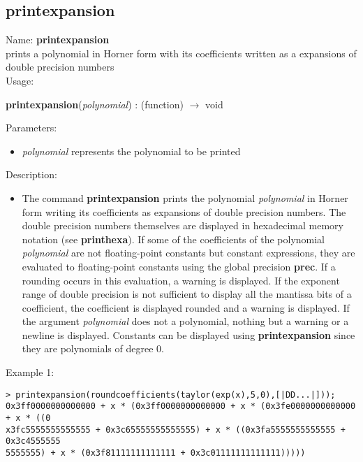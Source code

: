 \subsection{ printexpansion }
\noindent Name: \textbf{printexpansion}\\
prints a polynomial in Horner form with its coefficients written as a expansions of double precision numbers\\

\noindent Usage: 
\begin{center}
\textbf{printexpansion}(\emph{polynomial}) : (\textsf{function}) $\rightarrow$ \textsf{void}\\
\end{center}
Parameters: 
\begin{itemize}
\item \emph{polynomial} represents the polynomial to be printed
\end{itemize}
\noindent Description: \begin{itemize}

\item The command \textbf{printexpansion} prints the polynomial \emph{polynomial} in Horner form
   writing its coefficients as expansions of double precision
   numbers. The double precision numbers themselves are displayed in
   hexadecimal memory notation (see \textbf{printhexa}). 
   If some of the coefficients of the polynomial \emph{polynomial} are not
   floating-point constants but constant expressions, they are evaluated
   to floating-point constants using the global precision \textbf{prec}.  If a
   rounding occurs in this evaluation, a warning is displayed.
   If the exponent range of double precision is not sufficient to display
   all the mantissa bits of a coefficient, the coefficient is displayed
   rounded and a warning is displayed.
   If the argument \emph{polynomial} does not a polynomial, nothing but a
   warning or a newline is displayed. Constants can be displayed using
   \textbf{printexpansion} since they are polynomials of degree $0$.
\end{itemize}
\noindent Example 1: 
\begin{center}\begin{minipage}{15cm}\begin{Verbatim}[frame=single]
> printexpansion(roundcoefficients(taylor(exp(x),5,0),[|DD...|]));
0x3ff0000000000000 + x * (0x3ff0000000000000 + x * (0x3fe0000000000000 + x * ((0
x3fc5555555555555 + 0x3c65555555555555) + x * ((0x3fa5555555555555 + 0x3c4555555
5555555) + x * (0x3f81111111111111 + 0x3c01111111111111)))))
\end{Verbatim}
\end{minipage}\end{center}
